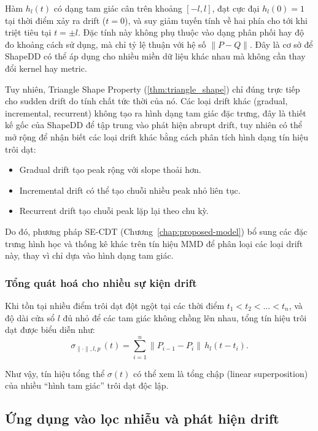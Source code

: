 Hàm $h_l(t)$ có dạng tam giác cân trên khoảng $[-l, l]$, đạt cực đại $h_l(0) = 1$ tại thời điểm xảy ra drift ($t=0$), và suy giảm tuyến tính về hai phía cho tới khi triệt tiêu tại $t = \pm l$. Đặc tính này không phụ thuộc vào dạng phân phối hay độ đo khoảng cách sử dụng, mà chỉ tỷ lệ thuận với hệ số $\|P - Q\|$. Đây là cơ sở để ShapeDD có thể áp dụng cho nhiều miền dữ liệu khác nhau mà không cần thay đổi kernel hay metric.

Tuy nhiên, Triangle Shape Property (\ref{thm:triangle_shape}) chỉ đúng trực tiếp cho sudden drift do tính chất tức thời của nó. Các loại drift khác (gradual, incremental, recurrent) không tạo ra hình dạng tam giác đặc trưng, đây là thiết kế gốc của ShapeDD để tập trung vào phát hiện abrupt drift, tuy nhiên có thể mở rộng để nhận biết các loại drift khác bằng cách phân tích hình dạng tín hiệu trôi dạt:
\begin{itemize}
	\item Gradual drift tạo peak rộng với slope thoải hơn.
	\item Incremental drift có thể tạo chuỗi nhiều peak nhỏ liên tục.
	\item Recurrent drift tạo chuỗi peak lặp lại theo chu kỳ.
\end{itemize}
Do đó, phương pháp SE-CDT (Chương~\ref{chap:proposed-model}) bổ sung các đặc trưng hình học và thống kê khác trên tín hiệu MMD để phân loại các loại drift này, thay vì chỉ dựa vào hình dạng tam giác.

\subsubsection{Tổng quát hoá cho nhiều sự kiện drift}

Khi tồn tại nhiều điểm trôi dạt đột ngột tại các thời điểm $t_1 < t_2 < \dots < t_n$, và độ dài cửa sổ $l$ đủ nhỏ để các tam giác không chồng lên nhau,
tổng tín hiệu trôi dạt được biểu diễn như:
\begin{equation}
	\sigma_{\parallel \cdot \parallel, l, p^\cdot}(t)
	= \sum_{i=1}^{n} \| P_{i-1} - P_i \| \, h_l(t - t_i).
\end{equation}

Như vậy, tín hiệu tổng thể $\sigma(t)$ có thể xem là tổng chập (linear superposition) của nhiều ``hình tam giác'' trôi dạt độc lập.

\subsection{Ứng dụng vào lọc nhiễu và phát hiện drift}


